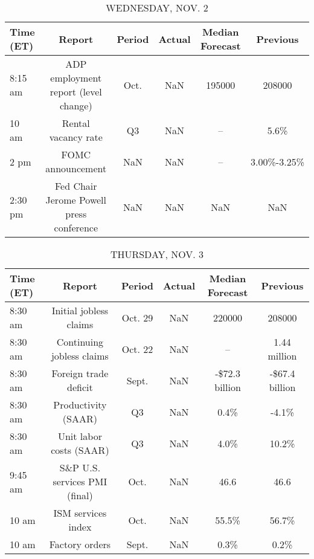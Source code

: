 \documentclass{article}%
\begin{document}
\begin{table}[htbp]%
\caption{WEDNESDAY, NOV. 2}%
\centering%
\begin{adjustbox}{width=1\textwidth}%
\begin{tabular}{lccccc}
\toprule
Time (ET) &                                   Report & Period & Actual & Median Forecast &    Previous \\
\midrule
  8:15 am &     ADP employment report (level change) &   Oct. &    NaN &          195000 &      208000 \\
    10 am &                      Rental vacancy rate &     Q3 &    NaN &              -- &        5.6\% \\
     2 pm &                        FOMC announcement &    NaN &    NaN &              -- & 3.00\%-3.25\% \\
  2:30 pm & Fed Chair Jerome Powell press conference &    NaN &    NaN &             NaN &         NaN \\
\bottomrule
\end{tabular}
%
\end{adjustbox}%
\end{table}

%


\begin{table}[htbp]%
\caption{THURSDAY, NOV. 3}%
\centering%
\begin{adjustbox}{width=1\textwidth}%
\begin{tabular}{lccccc}
\toprule
Time (ET) &                        Report &  Period & Actual & Median Forecast &       Previous \\
\midrule
  8:30 am &        Initial jobless claims & Oct. 29 &    NaN &          220000 &         208000 \\
  8:30 am &     Continuing jobless claims & Oct. 22 &    NaN &              -- &   1.44 million \\
  8:30 am &         Foreign trade deficit &   Sept. &    NaN &  -\$72.3 billion & -\$67.4 billion \\
  8:30 am &           Productivity (SAAR) &      Q3 &    NaN &            0.4\% &          -4.1\% \\
  8:30 am &       Unit labor costs (SAAR) &      Q3 &    NaN &            4.0\% &          10.2\% \\
  9:45 am & S\&P U.S. services PMI (final) &    Oct. &    NaN &            46.6 &           46.6 \\
    10 am &            ISM services index &    Oct. &    NaN &           55.5\% &          56.7\% \\
    10 am &                Factory orders &   Sept. &    NaN &            0.3\% &           0.2\% \\
\bottomrule
\end{tabular}
%
\end{adjustbox}%
\end{table}
\end{document}
